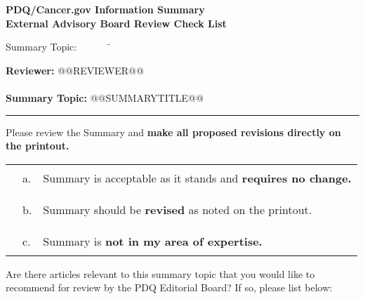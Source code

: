 \documentclass[letterpaper,12pt]{letter}
\begin{document}
\thispagestyle{empty}

\begin{center}
 \textbf{PDQ\textregistered/Cancer.gov Information Summary \\
         External Advisory Board Review Check List}
\end{center}

\vspace{24pt}

\begin{tabbing}

Summary Topic:\ \ \ \ \ \ \  \= \kill

\textbf{Reviewer: } \> @@REVIEWER@@ \\

\\

\textbf{Summary Topic: } \> @@SUMMARYTITLE@@

\end{tabbing}

\rule{6.5in}{.02in}

\vspace{12pt}

Please review the Summary and \textbf{make all proposed revisions 
directly on the printout.}

\vspace{12pt}

\begin{tabular}{llp{4.5in}}
\hspace{.25in}\rule{1in}{.01in} & a. & Summary is acceptable as it stands 
                                       and \textbf{requires no change.} \\
\\
\hspace{.25in}\rule{1in}{.01in} & b. & Summary should be \textbf{revised}
                                       as noted on the printout. \\
\\
\hspace{.25in}\rule{1in}{.01in} & c. & Summary is \textbf{not in my area
                                       of expertise.}
\end{tabular}

\vspace{18pt}

Are there articles relevant to this summary topic that you would like to
recommend for review by the PDQ\textregistered{} Editorial Board?  If so,
please list below:
\end{document}
